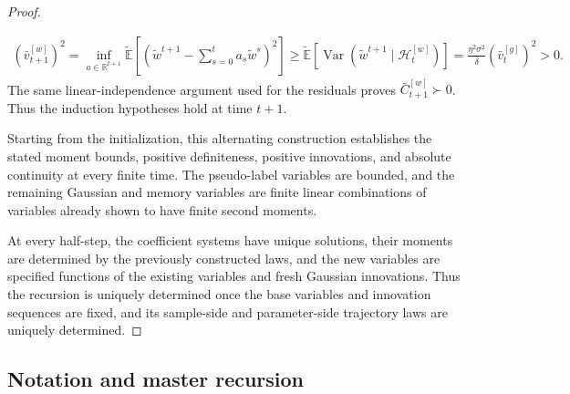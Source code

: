 \begin{proof}
\begin{enumerate}[wide]
\begin{equation}
            \begin{aligned}
                (\bar v_{t+1}^{[w]})^2
                =
                \inf_{a\in\mathbb R^{t+1}}
                \tilde{\mathbb E}
                \left[
                    \left(
                        \tilde w^{t+1}
                        -\sum_{s=0}^{t}a_s\tilde w^s
                    \right)^2
                \right]
                \geq
                \tilde{\mathbb E}
                \left[
                    \operatorname{Var}
                    (\tilde w^{t+1}\mid\mathcal H_t^{[w]})
                \right]
                =
                \frac{\eta^2\sigma^2}{\bar\delta}
                (\bar v_t^{[g]})^2
                >0.
            \end{aligned}
            \label{eq:mf-proof-weight-positive-innovation}
            \end{equation}
            The same linear-independence argument used for the
            residuals proves $\bar C_{t+1}^{[w]}\succ0$.
            Thus the induction hypotheses hold at time $t+1$.
        \end{enumerate}
        
        Starting from the initialization, this alternating construction
        establishes the stated moment bounds, positive definiteness,
        positive innovations, and absolute continuity at every finite time.
        The pseudo-label variables are bounded, and the remaining
        Gaussian and memory variables are finite linear combinations
        of variables already shown to have finite second moments.
        
        At every half-step, the coefficient systems have unique solutions,
        their moments are determined by the previously constructed laws,
        and the new variables are specified functions of the existing
        variables and fresh Gaussian innovations.
        Thus the recursion is uniquely determined once the base variables
        and innovation sequences are fixed, and its sample-side and
        parameter-side trajectory laws are uniquely determined.
        \end{proof}

\subsection{Notation and master recursion}
\label{subsec:notation-master-rec}

